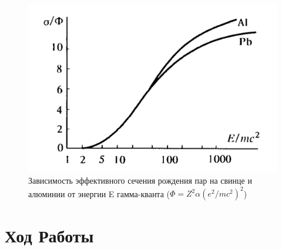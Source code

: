 \documentclass[a4paper,12pt]{article}
\theoremstyle{plain} %
\theoremstyle{definition} %
\theoremstyle{remark} %
\begin{document}
\begin{figure}[H]
    \includegraphics[width=0.4 \textwidth]{Materials/4.png}
    \caption{Зависимость эффективного сечения рождения пар на свинце и алюминии от энергии E гамма-кванта ($\Phi = Z^2 \alpha(e^2/mc^2)^2$) }
        
\end{figure}

\section{Ход Работы}
\end{document}

